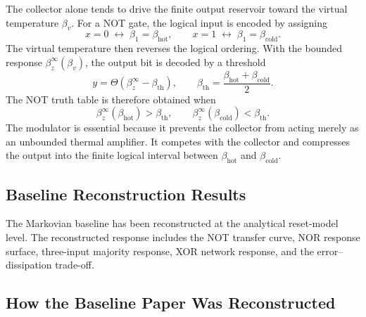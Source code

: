 \documentclass[11pt]{article}
\begin{document}
The collector alone tends to drive the finite output reservoir toward the virtual
temperature $\beta_v$.  For a NOT gate, the logical input is encoded by assigning
\begin{equation}
    x=0\;\leftrightarrow\;\beta_1=\beta_{\mathrm{hot}},
    \qquad
    x=1\;\leftrightarrow\;\beta_1=\beta_{\mathrm{cold}}.
\end{equation}
The virtual temperature then reverses the logical ordering.  With the bounded response
$\beta_z^\infty(\beta_v)$, the output bit is decoded by a threshold
\begin{equation}
    y
    =
    \Theta\!\left(
        \beta_z^\infty-\beta_{\mathrm{th}}
    \right),
    \qquad
    \beta_{\mathrm{th}}
    =
    \frac{\beta_{\mathrm{hot}}+\beta_{\mathrm{cold}}}{2}.
\end{equation}
The NOT truth table is therefore obtained when
\begin{equation}
    \beta_z^\infty(\beta_{\mathrm{hot}})
    >
    \beta_{\mathrm{th}},
    \qquad
    \beta_z^\infty(\beta_{\mathrm{cold}})
    <
    \beta_{\mathrm{th}}.
\end{equation}
The modulator is essential because it prevents the collector from acting merely as an
unbounded thermal amplifier.  It competes with the collector and compresses the output into
the finite logical interval between $\beta_{\mathrm{hot}}$ and $\beta_{\mathrm{cold}}$.

\subsection{Baseline Reconstruction Results}

The Markovian baseline has been reconstructed at the analytical reset-model level.  The
reconstructed response includes the NOT transfer curve, NOR response surface, three-input
majority response, XOR network response, and the error--dissipation trade-off.

\subsection{How the Baseline Paper Was Reconstructed}
\end{document}

